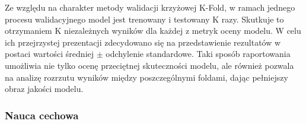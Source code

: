\documentclass[a4paper,twoside,12pt]{book}
\begin{document}
Ze względu na charakter metody walidacji krzyżowej K-Fold, w ramach jednego procesu walidacyjnego model jest trenowany i testowany K razy. Skutkuje to otrzymaniem K niezależnych wyników dla każdej z metryk oceny modelu. W celu ich przejrzystej prezentacji zdecydowano się na przedstawienie rezultatów w postaci wartości średniej $\pm$ odchylenie standardowe. Taki sposób raportowania umożliwia nie tylko ocenę przeciętnej skuteczności modelu, ale również pozwala na analizę rozrzutu wyników między poszczególnymi foldami, dając pełniejszy obraz jakości modelu.



\newpage
\subsubsection*{Nauca cechowa}
\begin{table}[!h]
	\centering
	\caption{Wartości miar jakościowych dla nauki cechowej dla walidacji Kfold}
	\label{k-fold_cechowa}
\end{table}
\end{document}
